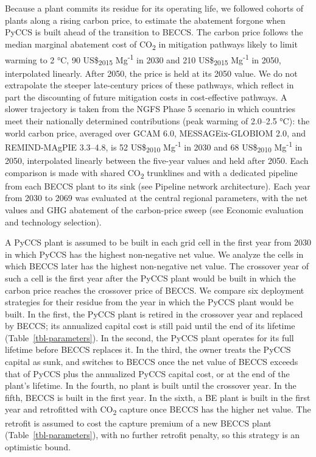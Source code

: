 \documentclass[
  letterpaper,
  twoside,
  twocolumn,
  9pt]{article}
\begin{document}
Because a plant commits its residue for its operating life, we followed
cohorts of plants along a rising carbon price, to estimate the abatement
forgone when PyCCS is built ahead of the transition to BECCS. The carbon
price follows the median marginal abatement cost of CO\textsubscript{2}
in mitigation pathways likely to limit warming to 2 °C, 90
US\$\textsubscript{2015} Mg\textsuperscript{-1} in 2030 and 210
US\$\textsubscript{2015} Mg\textsuperscript{-1} in
2050,\citep{riahi2022} interpolated linearly. After 2050, the price is
held at its 2050 value. We do not extrapolate the steeper late-century
prices of these pathways, which reflect in part the discounting of
future mitigation costs in cost-effective pathways.\citep{emmerling2019}
A slower trajectory is taken from the NGFS Phase 5 scenario in which
countries meet their nationally determined contributions (peak warming
of 2.0--2.5 °C): the world carbon price, averaged over GCAM 6.0,
MESSAGEix-GLOBIOM 2.0, and REMIND-MAgPIE 3.3--4.8, is 52
US\$\textsubscript{2010} Mg\textsuperscript{-1} in 2030 and 68
US\$\textsubscript{2010} Mg\textsuperscript{-1} in 2050,\citep{ngfs2026}
interpolated linearly between the five-year values and held after 2050.
Each comparison is made with shared CO\textsubscript{2} trunklines and
with a dedicated pipeline from each BECCS plant to its sink (see
Pipeline network architecture). Each year from 2030 to 2069 was
evaluated at the central regional parameters, with the net values and
GHG abatement of the carbon-price sweep (see Economic evaluation and
technology selection).

A PyCCS plant is assumed to be built in each grid cell in the first year
from 2030 in which PyCCS has the highest non-negative net value. We
analyze the cells in which BECCS later has the highest non-negative net
value. The crossover year of such a cell is the first year after the
PyCCS plant would be built in which the carbon price reaches the
crossover price of BECCS. We compare six deployment strategies for their
residue from the year in which the PyCCS plant would be built. In the
first, the PyCCS plant is retired in the crossover year and replaced by
BECCS; its annualized capital cost is still paid until the end of its
lifetime (Table~\ref{tbl-parameters}). In the second, the PyCCS plant
operates for its full lifetime before BECCS replaces it. In the third,
the owner treats the PyCCS capital as sunk, and switches to BECCS once
the net value of BECCS exceeds that of PyCCS plus the annualized PyCCS
capital cost, or at the end of the plant's lifetime. In the fourth, no
plant is built until the crossover year. In the fifth, BECCS is built in
the first year. In the sixth, a BE plant is built in the first year and
retrofitted with CO\textsubscript{2} capture once BECCS has the higher
net value. The retrofit is assumed to cost the capture premium of a new
BECCS plant (Table~\ref{tbl-parameters}), with no further retrofit
penalty, so this strategy is an optimistic bound.
\end{document}
